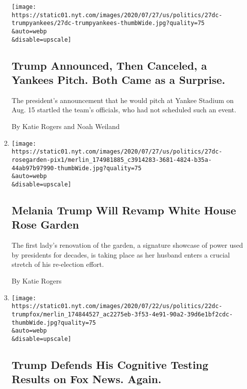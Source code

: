 \begin{enumerate}
  \texttt{[image: https://static01.nyt.com/images/2020/07/27/us/politics/27dc-trumpyankees/27dc-trumpyankees-thumbWide.jpg?quality=75\\\&auto=webp\\\&disable=upscale]}

  \hypertarget{trump-announced-then-canceled-a-yankees-pitch-both-came-as-a-surprise}{%
  \subsection{Trump Announced, Then Canceled, a Yankees Pitch. Both Came
  as a
  Surprise.}\label{trump-announced-then-canceled-a-yankees-pitch-both-came-as-a-surprise}}

  The president's announcement that he would pitch at Yankee Stadium on
  Aug. 15 startled the team's officials, who had not scheduled such an
  event.

  By Katie Rogers and Noah Weiland
\item
  \href{/2020/07/27/us/politics/melania-trump-white-house-rose-garden.html}{}

  \texttt{[image: https://static01.nyt.com/images/2020/07/27/us/politics/27dc-rosegarden-pix1/merlin\_174981885\_c3914283-3681-4824-b35a-44ab97b97990-thumbWide.jpg?quality=75\\\&auto=webp\\\&disable=upscale]}

  \hypertarget{melania-trump-will-revamp-white-house-rose-garden}{%
  \subsection{Melania Trump Will Revamp White House Rose
  Garden}\label{melania-trump-will-revamp-white-house-rose-garden}}

  The first lady's renovation of the garden, a signature showcase of
  power used by presidents for decades, is taking place as her husband
  enters a crucial stretch of his re-election effort.

  By Katie Rogers
\item
  \href{/2020/07/22/us/politics/trump-cognitive-test-results.html}{}

  \texttt{[image: https://static01.nyt.com/images/2020/07/22/us/politics/22dc-trumpfox/merlin\_174844527\_ac2275eb-3f53-4e91-90a2-39d6e1bf2cdc-thumbWide.jpg?quality=75\\\&auto=webp\\\&disable=upscale]}

  \hypertarget{trump-defends-his-cognitive-testing-results-on-fox-news-again}{%
  \subsection{Trump Defends His Cognitive Testing Results on Fox News.
  Again.}\label{trump-defends-his-cognitive-testing-results-on-fox-news-again}}


\end{enumerate}
